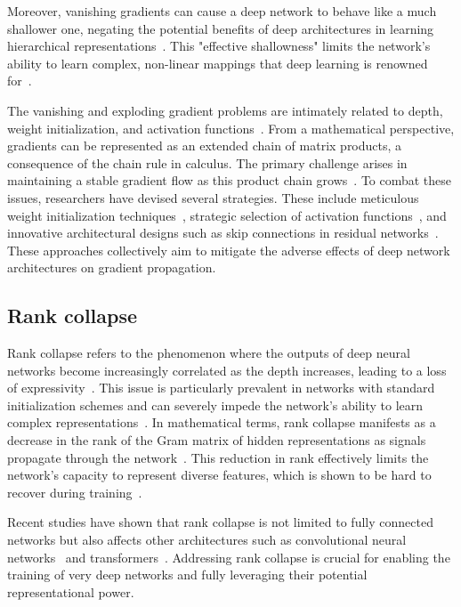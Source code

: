 Moreover, vanishing gradients can cause a deep network to behave like a much shallower one, negating the potential benefits of deep architectures in learning hierarchical representations~\cite{srivastava2015training}. This "effective shallowness" limits the network's ability to learn complex, non-linear mappings that deep learning is renowned for~\cite{bengio2007scaling}.

The vanishing and exploding gradient problems are intimately related to depth, weight initialization, and activation functions~\cite{glorot2010understanding, he2015delving}. From a mathematical perspective, gradients can be represented as an extended chain of matrix products, a consequence of the chain rule in calculus. The primary challenge arises in maintaining a stable gradient flow as this product chain grows~\cite{saxe2013exact,pascanu2013difficulty}. To combat these issues, researchers have devised several strategies. These include meticulous weight initialization techniques~\cite{saxe2013exact, glorot2010understanding}, strategic selection of activation functions~\cite{nair2010rectified, clevert2015fast,klambauer2017self}, and innovative architectural designs such as skip connections in residual networks~\cite{he2016deep}. These approaches collectively aim to mitigate the adverse effects of deep network architectures on gradient propagation.


\subsection{Rank collapse}

Rank collapse refers to the phenomenon where the outputs of deep neural networks become increasingly correlated as the depth increases, leading to a loss of expressivity~\cite{daneshmand2020batch}. This issue is particularly prevalent in networks with standard initialization schemes and can severely impede the network's ability to learn complex representations~\cite{daneshmand2020batch}. In mathematical terms, rank collapse manifests as a decrease in the rank of the Gram matrix of hidden representations as signals propagate through the network~\cite{daneshmand2020batch}. This reduction in rank effectively limits the network's capacity to represent diverse features, which is shown to be hard to recover during training~\cite{daneshmand2020batch,daneshmand2021batch}.

Recent studies have shown that rank collapse is not limited to fully connected networks but also affects other architectures such as convolutional neural networks~\cite{xiao2018dynamical} and transformers~\cite{dong2021attention,noci2022signal}. Addressing rank collapse is crucial for enabling the training of very deep networks and fully leveraging their potential representational power.

